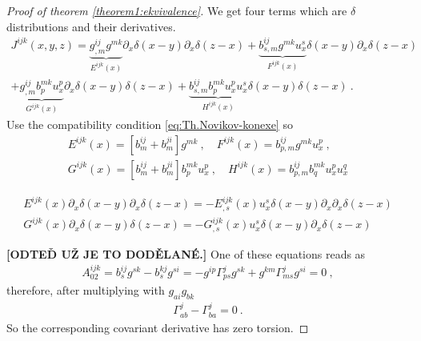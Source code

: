 \begin{proof}[Proof of theorem \ref{theorem1:ekvivalence}]
    We get four terms which are $\delta$ distributions and their derivatives.
    \begin{align*}
        J^{ijk}(x,y,z) =
        \underbrace{g^{ij}_{,m} g^{mk} }_{E^{ijk}(x)} \partial_x \delta(x-y) \partial_x \delta(z-x) 
        + \underbrace{b^{ij}_{s,m} g^{mk} u^s_x}_{F^{ijk}(x)} \delta(x-y) \partial_x \delta(z-x) 
        \\+ \underbrace{g^{ij}_{,m} b^{mk}_p u^p_x}_{G^{ijk}(x)}  \partial_x \delta(x-y) \delta(z-x) 
        + \underbrace{b^{ij}_{s,m} b^{mk}_p u^p_x u^s_x}_{H^{ijk}(x)} \delta(x-y) \delta(z-x) \:.
    \end{align*}
    Use the compatibility condition \eqref{eq:Th.Novikov-konexe} so
    \begin{align}
        E^{ijk}(x) = [b^{ij}_m + b^{ji}_m ]g^{mk} \:, \quad 
        F^{ijk}(x) = b^{ij}_{p,m} g^{mk} u^p_x \:, \\
        G^{ijk}(x) =  [b^{ij}_m + b^{ji}_m ]b^{mk}_p u^p_x \:, \quad
        H^{ijk}(x) = b^{ij}_{p,m} b^{mk}_q u^p_x u^q_x
    \end{align}

    \begin{align}
        E^{ijk}(x) \partial_x \delta(x-y) \partial_x \delta(z-x) = - E^{ijk}_{,s}(x) u^s_x \delta(x-y) \partial_x \partial_x \delta(z-x) \\
        G^{ijk}(x) \partial_x \delta(x-y) \delta(z-x) = - G^{ijk}_{,s}(x) u^s_x \delta(x-y) \partial_x \delta(z-x)
    \end{align}

    \textbf{[ODTEĎ UŽ JE TO DODĚLANÉ.]}
    One of these equations reads as
    \begin{align}
        A_{02}^{ijk} = b^{ij}_s g^{sk} - b^{kj}_s g^{si} = -g^{ip} \Gamma^{j}_{ps} g^{sk} + g^{km} \Gamma^{j}_{ms} g^{si} =0 \:,
    \end{align}
    therefore, after multiplying with $g_{ai}g_{bk}$
    \begin{align}
        \Gamma^j_{ab} - \Gamma^j_{ba} = 0 \:.
    \end{align}
    So the corresponding covariant derivative has zero torsion.


\end{proof}

